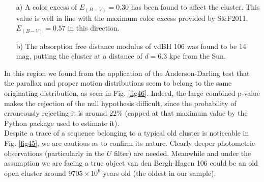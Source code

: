 \documentclass[draft]{aa}
\begin{document}
\begin{itemize}
\item [a)] A color excess of $E_{(B-V)} = 0.30$ has been found to affect the
cluster. This value is well in line with the maximum color excess provided
by S\&F2011, $E_{(B-V)} = 0.57$ in this direction.
\item [b)] The absorption free distance modulus of vdBH 106 was found to be
14 mag, putting the cluster at a distance of $d=6.3$ kpc from the Sun.
\end{itemize}

In this region we found from the application of the Anderson-Darling test that
the parallax and proper motion distributions seem to belong to the same
originating distribution, as seen in Fig. \ref{fig46}. Indeed, the
large combined p-value makes the rejection of the null hypothesis difficult,
since the probability of erroneously rejecting it is around $22\%$ (capped
at that maximum value by the Python package used to estimate it).\\

Despite a trace of a sequence belonging to a typical old cluster is
noticeable in Fig. \ref{fig45}, we are cautious as to confirm its nature.
Clearly deeper photometric observations (particularly in the $U$ filter) are
needed. Meanwhile and under the assumption we are facing a true object van
den Bergh-Hagen 106 could be an old open cluster around $9705\times10^6$ years
old (the oldest in our sample).
\end{document}
